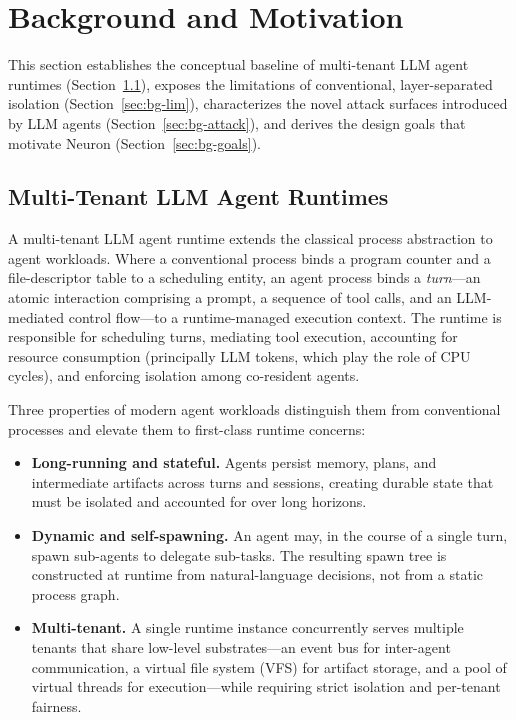 \section{Background and Motivation}
\label{sec:bg}

This section establishes the conceptual baseline of multi-tenant LLM agent
runtimes (Section~\ref{sec:bg-kernel}), exposes the limitations of conventional,
layer-separated isolation (Section~\ref{sec:bg-lim}), characterizes the novel attack
surfaces introduced by LLM agents (Section~\ref{sec:bg-attack}), and derives the
design goals that motivate Neuron (Section~\ref{sec:bg-goals}).

\subsection{Multi-Tenant LLM Agent Runtimes}
\label{sec:bg-kernel}

A multi-tenant LLM agent runtime extends the classical process abstraction
to agent workloads. Where a conventional process binds a program counter and a
file-descriptor table to a scheduling entity, an agent process binds a
\emph{turn}---an atomic interaction comprising a prompt, a sequence of tool
calls, and an LLM-mediated control flow---to a runtime-managed execution
context. The runtime is responsible for scheduling turns, mediating tool
execution, accounting for resource consumption (principally LLM tokens, which
play the role of CPU cycles), and enforcing isolation among co-resident
agents.

Three properties of modern agent workloads distinguish them from conventional
processes and elevate them to first-class runtime concerns:

\begin{itemize}
    \item \textbf{Long-running and stateful.} Agents persist memory, plans, and
    intermediate artifacts across turns and sessions, creating durable state
    that must be isolated and accounted for over long horizons.
    \item \textbf{Dynamic and self-spawning.} An agent may, in the course of a
    single turn, spawn sub-agents to delegate sub-tasks. The resulting spawn
    tree is constructed at runtime from natural-language decisions, not from a
    static process graph.
    \item \textbf{Multi-tenant.} A single runtime instance concurrently serves
    multiple tenants that share low-level substrates---an event bus for
    inter-agent communication, a virtual file system (VFS) for artifact
    storage, and a pool of virtual threads for execution---while requiring
    strict isolation and per-tenant fairness.
\end{itemize}

